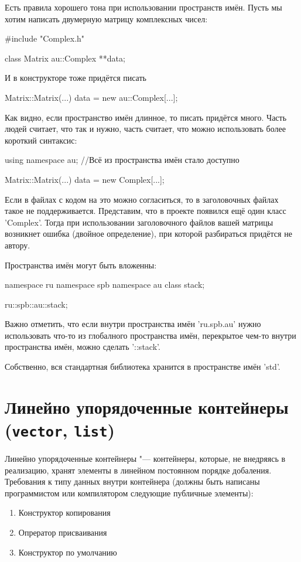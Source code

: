 Есть правила хорошего тона при использовании пространств имён. Пусть мы хотим написать двумерную матрицу комплексных чисел:
\begin{cppcode}
#include "Complex.h"
 
class Matrix {
	au::Complex **data;
}
\end{cppcode}
И в конструкторе тоже придётся писать
\begin{cppcode}
Matrix::Matrix(...) {
	data = new au::Complex[...];
}
\end{cppcode}
 
Как видно, если пространство имён длинное, то писать придётся много.
Часть людей считает, что так и нужно, часть считает, что можно использовать более короткий синтаксис:
\begin{cppcode}
using namespace au; //Всё из пространства имён стало доступно
 
Matrix::Matrix(...) {
	data = new Complex[...];
}
\end{cppcode}
Если в файлах с кодом на это можно согласиться, то в заголовочных файлах такое не поддерживается.
Представим, что в проекте появился ещё один класс \cpp'Complex'.
Тогда при использовании заголовочного файлов вашей матрицы возникнет ошибка (двойное определение), при которой разбираться придётся не автору.
 
Пространства имён могут быть вложенны:
\begin{cppcode}
namespace ru {
	namespace spb {
		namespace au {
			class stack;
		}
	}
}
 
ru::spb::au::stack;
\end{cppcode}
 
Важно отметить, что если внутри пространства имён \cpp'ru.spb.au' нужно использовать что-то из глобалного пространства имён, перекрытое чем-то внутри пространства имён, можно сделать \cpp'::stack'.
 
Собственно, вся стандартная библиотека хранится в пространстве имён \cpp'std'.
 
\section{Линейно упорядоченные контейнеры (\texttt{vector}, \texttt{list})}
 
Линейно упорядоченные контейнеры "--- контейнеры, которые, не внедряясь в реализацию, хранят элементы в линейном постоянном порядке добаления. Требования к типу данных внутри контейнера (должны быть написаны программистом или компилятором следующие публичные элементы):
\begin{enumerate}
	\item Конструктор копирования
	\item Опрератор присваивания
	\item Конструктор по умолчанию
\end{enumerate}
 
